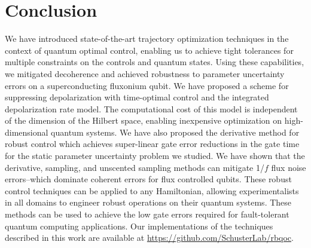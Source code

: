 \section{Conclusion}
We have introduced state-of-the-art trajectory optimization
techniques in the context of quantum optimal control, enabling
us to achieve tight tolerances for multiple constraints on the
controls and quantum states. Using these capabilities, we
mitigated decoherence and
achieved robustness to parameter uncertainty
errors on a superconducting fluxonium qubit.
We have proposed a scheme for suppressing
depolarization with time-optimal
control and the integrated depolarization rate model.
The computational cost of this model is
independent of the dimension of the Hilbert space, enabling
inexpensive optimization on high-dimensional quantum systems.
We have also proposed the derivative method for robust control which achieves
super-linear gate error reductions in the gate time for the static parameter
uncertainty problem we studied.
We have shown that the derivative, sampling, and unscented sampling methods
can mitigate 1/$f$ flux noise errors--which
dominate coherent errors for flux controlled qubits.
These robust control techniques can be applied
to any Hamiltonian,
allowing experimentalists in all domains to engineer robust
operations on their quantum systems.
These methods can be used to achieve the low gate errors
required for fault-tolerant quantum computing applications. Our
implementations of the techniques described in this work are available
at \url{https://github.com/SchusterLab/rbqoc}.

